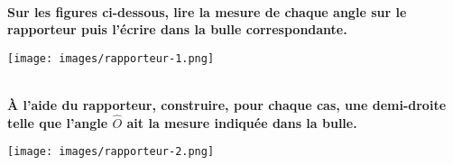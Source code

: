 






\exercice \diff[1] \\
\textbf{Sur les figures ci-dessous, lire la mesure de chaque angle sur le rapporteur puis l'écrire dans la bulle correspondante.} \\

\begin{Figure}
 \centering
 \texttt{[image: images/rapporteur-1.png]}
\end{Figure}

\newpage
\exercice \diff[2] \\
\textbf{À l'aide du rapporteur, construire, pour chaque cas, une demi-droite telle que l'angle $\widehat{O}$ ait la mesure indiquée dans la bulle.} \\

\begin{Figure}
 \centering
 \texttt{[image: images/rapporteur-2.png]}
\end{Figure}



